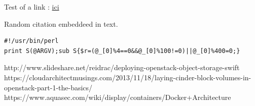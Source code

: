 \documentclass{article}
\begin{document}
Test of a link : \href{http://www.atec.com}{ici}

Random citation \cite{WEBSITE:1} embeddeed in text.

\begin{lstlisting}
#!/usr/bin/perl
print S(@ARGV);sub S{$r=(@_[0]%4==0&&@_[0]%100!=0)||@_[0]%400=0;}
\end{lstlisting}

\newpage



http://www.slideshare.net/reidrac/deploying-openstack-object-storage-swift
https://cloudarchitectmusings.com/2013/11/18/laying-cinder-block-volumes-in-openstack-part-1-the-basics/
https://www.aquasec.com/wiki/display/containers/Docker+Architecture
\end{document}
